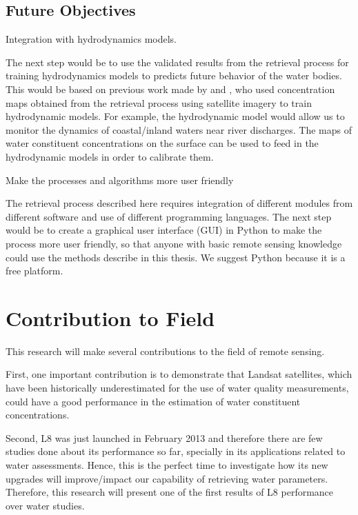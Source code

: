 \subsection{Future Objectives}
	\begin{enumerate}
			{\bf \item Integration with hydrodynamics models.  } 

The next step would be to use the validated results from the retrieval process for training hydrodynamics models to predicts future behavior of the water bodies. This would be based on previous work made by \cite{Pahlevan:2012} and \cite{GeraceThesis}, who used concentration maps obtained from the retrieval process using satellite imagery to train hydrodynamic models. For example, the hydrodynamic model would allow us to monitor the dynamics of coastal/inland waters near river discharges. The maps of water constituent concentrations on the surface can be used to feed in the hydrodynamic models in order to calibrate them. 

			{\bf \item Make the processes and algorithms more user friendly} 

The retrieval process described here requires integration of different modules from different software and use of different programming languages. The next step would be to create a graphical user interface (GUI) in Python to make the process more user friendly, so that anyone with basic remote sensing knowledge could use the methods describe in this thesis. We suggest Python because it is a free platform.

	\end{enumerate}	

		

\section{Contribution to Field}
\label{sec:contributiontofield}
This research will make several contributions to the field of remote sensing.

First, one important contribution is to demonstrate that Landsat satellites, which have been historically underestimated for the use of water quality measurements, could have a good performance in the estimation of water constituent concentrations.

Second, L8 was just launched in February 2013 and therefore there are few studies done about its performance so far, specially in its applications related to water assessments. Hence, this is the perfect time to investigate how its new upgrades will improve/impact our capability of retrieving water parameters. Therefore, this research will present one of the first results of L8 performance over water studies.  

